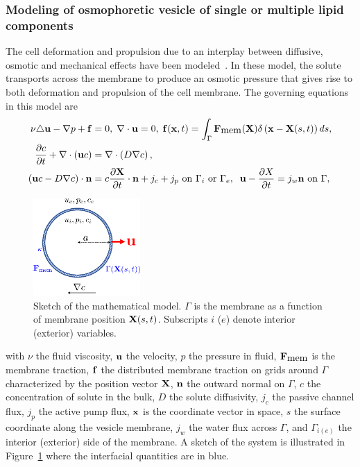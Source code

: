 \documentclass[11pt]{article}
\begin{document}
\subsubsection{Modeling of osmophoretic vesicle of single or multiple lipid components\label{subsubsec:aim1_math}}
The cell deformation and propulsion due to an interplay between
diffusive, osmotic and mechanical effects have been
modeled~\cite{Blount2012_PRE, Vogl2014_JRSInterface, YaoMori2017_JCP}.
In these model, the solute transports across the membrane to produce an
osmotic pressure that gives rise to both deformation and propulsion of
the cell membrane. The governing equations in this model are
\begin{align}
\nu \triangle {\bf u} - \nabla p + {\bf f} &=0, \;\nabla\cdot{\bf u} = 0, \; {\bf f}({\bf x},t) = \int_{\Gamma}{\bf F}_{\mbox{mem}}({\bf X})\delta\left({\bf x}-{\bf X}(s,t)\right)ds,\\
\frac{\partial c}{\partial t} + \nabla\cdot\left({\bf u} c\right) &= \nabla\cdot\left(D\nabla c\right),\\
\left({\bf u} c-D\nabla c\right)\cdot{\bf n} &= c\frac{\partial {\bf X}}{\partial t}\cdot{\bf n}+j_c+j_p \mbox{ on } \Gamma_i \mbox{ or } \Gamma_e,\;\;{\bf u} - \frac{\partial X}{\partial t} = j_w {\bf n} \mbox{ on } \Gamma,
\end{align}
\begin{figure}
\vspace*{-10pt}
\centerline{\includegraphics[width=1.6in]{figs/math_model_illustrate.pdf}}
\caption{\label{fig:math_model_illustration} \footnotesize Sketch of the
  mathematical model. $\Gamma$ is the membrane as a function of membrane
  position ${\bf X}(s,t)$. Subscripts $i$ ($e$) denote interior
  (exterior) variables.}
\end{figure}
%
with $\nu$ the fluid viscosity,  ${\bf u}$ the velocity, $p$ the
pressure in fluid, ${\bf F}_{\mbox{mem}}$ is the membrane traction,
${\bf f}$ the distributed membrane traction on grids around $\Gamma$
characterized by the position vector ${\bf X}$, ${\bf n}$ the outward
normal on $\Gamma$, $c$ the concentration of solute in the bulk, $D$ the
solute diffusivity, $j_c$ the passive channel flux, $j_p$ the active
pump flux, ${\bf x}$ is the coordinate vector in space, $s$ the surface
coordinate along the vesicle membrane, $j_w$ the water flux across
$\Gamma$, and $\Gamma_{i(e)}$ the interior (exterior) side of the
membrane.  A sketch of the system is illustrated in
Figure~\ref{fig:math_model_illustration} where the interfacial
quantities are in blue.
\end{document}
